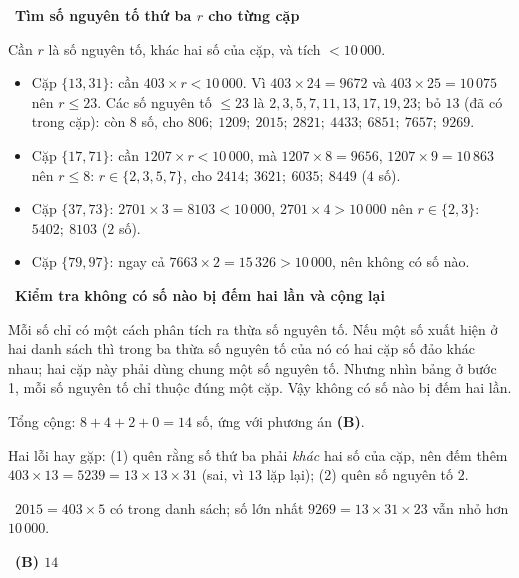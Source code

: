\documentclass[11pt]{article}
\providecommand{\AnsWord}{Đáp số}
\newcommand{\ans}[1]{\par\smallskip{\bfseries\color{tmGreen!88!black}\AnsWord:}\ {\bfseries\color{AnsRed}#1}\par}
\newcommand{\step}[2]{\par\smallskip\noindent{\bfseries\color{tmBlue!85!black}\StepWord~#1.}\ {\bfseries #2}\par\nopagebreak}
\newcommand{\verify}[1]{\par\smallskip\noindent{\bfseries\color{tmGreen!80!black}\faCheckCircle\ \CheckWord}\ #1\par}
\def\AnsWord{Đáp số}
\def\StepWord{Bước}
\def\CheckWord{Thử lại:}
\begin{document}
{\step{3}{Tìm số nguyên tố thứ ba $r$ cho từng cặp}
Cần $r$ là số nguyên tố, khác hai số của cặp, và tích $<10\,000$.
\begin{itemize}[leftmargin=1.2em,itemsep=1pt,topsep=2pt]
\item Cặp $\{13,31\}$: cần $403\times r<10\,000$. Vì $403\times24=9672$ và $403\times25=10\,075$ nên $r\le23$.
Các số nguyên tố $\le23$ là $2,3,5,7,11,13,17,19,23$; bỏ $13$ (đã có trong cặp): còn $8$ số, cho
$806;\ 1209;\ 2015;\ 2821;\ 4433;\ 6851;\ 7657;\ 9269$.
\item Cặp $\{17,71\}$: cần $1207\times r<10\,000$, mà $1207\times8=9656$, $1207\times9=10\,863$ nên $r\le8$:
$r\in\{2,3,5,7\}$, cho $2414;\ 3621;\ 6035;\ 8449$ ($4$ số).
\item Cặp $\{37,73\}$: $2701\times3=8103<10\,000$, $2701\times4>10\,000$ nên $r\in\{2,3\}$: $5402;\ 8103$ ($2$ số).
\item Cặp $\{79,97\}$: ngay cả $7663\times2=15\,326>10\,000$, nên không có số nào.
\end{itemize}

\step{4}{Kiểm tra không có số nào bị đếm hai lần và cộng lại}
\begin{proofbox}Mỗi số chỉ có một cách phân tích ra thừa số nguyên tố. Nếu một số xuất hiện ở hai danh sách thì
trong ba thừa số nguyên tố của nó có hai cặp số đảo khác nhau; hai cặp này phải dùng chung một số nguyên tố.
Nhưng nhìn bảng ở bước 1, mỗi số nguyên tố chỉ thuộc đúng một cặp. Vậy không có số nào bị đếm hai lần.\end{proofbox}
Tổng cộng: $8+4+2+0=14$ số, ứng với phương án \textbf{(B)}.
\begin{warnbox}Hai lỗi hay gặp: (1) quên rằng số thứ ba phải \emph{khác} hai số của cặp, nên đếm thêm
$403\times13=5239=13\times13\times31$ (sai, vì $13$ lặp lại); (2) quên số nguyên tố $2$.\end{warnbox}
\verify{$2015=403\times5$ có trong danh sách; số lớn nhất $9269=13\times31\times23$ vẫn nhỏ hơn $10\,000$.}
\ans{(B) $14$}
}
\end{document}
